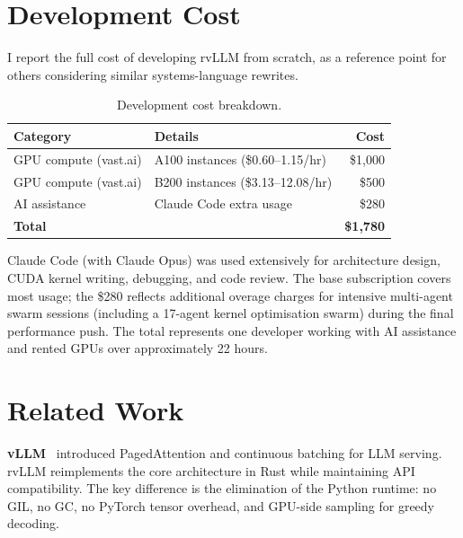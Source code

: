 \documentclass[11pt,a4paper]{article}
\newcommand{\thead}[1]{\textbf{\color{white}#1}}
\begin{document}
\section{Development Cost}
\label{sec:cost}

I report the full cost of developing rvLLM from scratch, as a reference point
for others considering similar systems-language rewrites.

\begin{table}[h]
  \centering
  \caption{Development cost breakdown.}
  \label{tab:cost}
  \small
  \begin{tabular}{@{}llr@{}}
    \toprule
    \rowcolor{HeaderBlue} \thead{Category} & \thead{Details} & \thead{Cost} \\
    \midrule
    GPU compute (vast.ai) & A100 instances (\$0.60--1.15/hr) & \$1{,}000 \\
    \rowcolor{gray!8}
    GPU compute (vast.ai) & B200 instances (\$3.13--12.08/hr) & \$500 \\
    AI assistance         & Claude Code extra usage & \$280 \\
    \midrule
    \rowcolor{gray!8}
    \textbf{Total}        &                         & \textbf{\$1{,}780} \\
    \bottomrule
  \end{tabular}
\end{table}

Claude Code (with Claude Opus) was used extensively for architecture design, CUDA
kernel writing, debugging, and code review. The base subscription covers most usage;
the \$280 reflects additional overage charges for intensive multi-agent swarm sessions
(including a 17-agent kernel optimisation swarm) during the final performance push.
The total represents one developer working with AI assistance and rented GPUs over
approximately 22 hours.

\section{Related Work}
\label{sec:related}

\textbf{vLLM}~\cite{kwon2023vllm} introduced PagedAttention and continuous batching
for LLM serving. rvLLM reimplements the core architecture in Rust while maintaining
API compatibility. The key difference is the elimination of the Python runtime:
no GIL, no GC, no PyTorch tensor overhead, and GPU-side sampling for greedy decoding.
\end{document}
